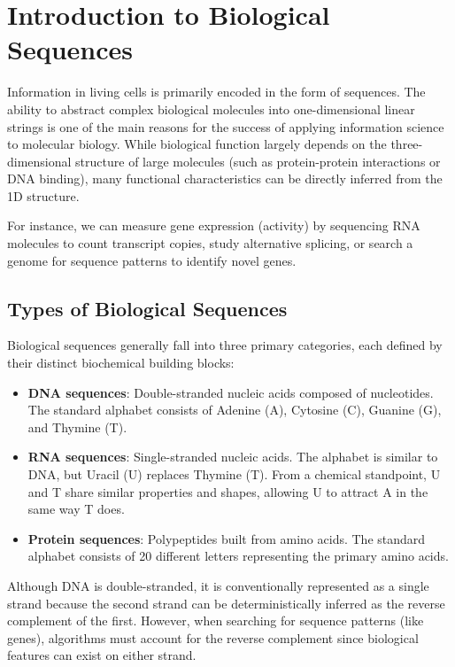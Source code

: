 


\section{Introduction to Biological Sequences}

Information in living cells is primarily encoded in the form of sequences. The ability to abstract complex biological molecules into one-dimensional linear strings is one of the main reasons for the success of applying information science to molecular biology. While biological function largely depends on the three-dimensional structure of large molecules (such as protein-protein interactions or DNA binding), many functional characteristics can be directly inferred from the 1D structure. 

For instance, we can measure gene expression (activity) by sequencing RNA molecules to count transcript copies, study alternative splicing, or search a genome for sequence patterns to identify novel genes.

\subsection{Types of Biological Sequences}
Biological sequences generally fall into three primary categories, each defined by their distinct biochemical building blocks:

\begin{itemize}
    \item \textbf{DNA sequences}: Double-stranded nucleic acids composed of nucleotides. The standard alphabet consists of Adenine (A), Cytosine (C), Guanine (G), and Thymine (T).
    \item \textbf{RNA sequences}: Single-stranded nucleic acids. The alphabet is similar to DNA, but Uracil (U) replaces Thymine (T). From a chemical standpoint, U and T share similar properties and shapes, allowing U to attract A in the same way T does.
    \item \textbf{Protein sequences}: Polypeptides built from amino acids. The standard alphabet consists of 20 different letters representing the primary amino acids.
\end{itemize}

\sta Although DNA is double-stranded, it is conventionally represented as a single strand because the second strand can be deterministically inferred as the reverse complement of the first. However, when searching for sequence patterns (like genes), algorithms must account for the reverse complement since biological features can exist on either strand.

